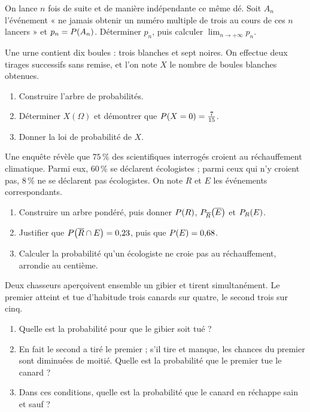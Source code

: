 \begin{annales}
On lance $n$ fois de suite et de manière indépendante ce même dé. Soit
$A_{n}$ l'événement « ne jamais obtenir un numéro multiple de trois au cours
de ces $n$ lancers » et $p_{n} = \proba{A_{n}}$. Déterminer $p_{n}$, puis
calculer $\lim_{n\to+\infty}p_{n}$.

Une urne contient dix boules : trois blanches et sept noires. On effectue deux
tirages successifs sans remise, et l'on note $X$ le nombre de boules blanches
obtenues.
\begin{enumerate}[label=\textbf{\alph*)}, leftmargin=*, itemsep=0.15em]
  \item Construire l'arbre de probabilités.
  \item Déterminer $X(\Omega)$ et démontrer que
        $\proba{X = 0} = \frac{7}{15}$.
  \item Donner la loi de probabilité de $X$.
\end{enumerate}

Une enquête révèle que $75\,\%$ des scientifiques interrogés croient au
réchauffement climatique. Parmi eux, $60\,\%$ se déclarent écologistes ; parmi
ceux qui n'y croient pas, $8\,\%$ ne se déclarent pas écologistes. On note $R$
et $E$ les événements correspondants.
\begin{enumerate}[label=\textbf{\alph*)}, leftmargin=*, itemsep=0.15em]
  \item Construire un arbre pondéré, puis donner $\proba{R}$,
        $\probacond{\evtc{E}}{\evtc{R}}$ et $\probacond{E}{R}$.
  \item Justifier que $\proba{\evtc{R} \cap E} = 0{,}23$, puis que
        $\proba{E} = 0{,}68$.
  \item Calculer la probabilité qu'un écologiste ne croie pas au
        réchauffement, arrondie au centième.
\end{enumerate}

Deux chasseurs aperçoivent ensemble un gibier et tirent simultanément. Le
premier atteint et tue d'habitude trois canards sur quatre, le second trois
sur cinq.
\begin{enumerate}[label=\textbf{\alph*)}, leftmargin=*, itemsep=0.15em]
  \item Quelle est la probabilité pour que le gibier soit tué ?
  \item En fait le second a tiré le premier ; s'il tire et manque, les chances
        du premier sont diminuées de moitié. Quelle est la probabilité que le
        premier tue le canard ?
  \item Dans ces conditions, quelle est la probabilité que le canard en
        réchappe sain et sauf ?
\end{enumerate}


\end{annales}
